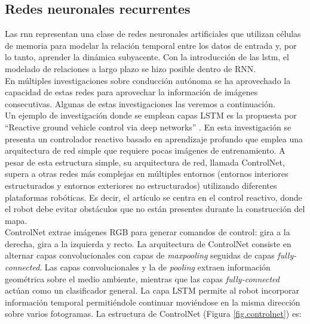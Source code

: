 \subsection{Redes neuronales recurrentes}


Las \acrfull{rnn} representan una clase de redes neuronales artificiales que utilizan células de memoria para modelar la relación temporal entre los datos de entrada y, por lo tanto, aprender la dinámica subyacente. Con la introducción de las \acrfull{lstm}, el modelado de relaciones a largo plazo se hizo posible dentro de RNN.\\

En múltiples investigaciones sobre conducción autónoma se ha aprovechado la capacidad de estas redes para aprovechar la información de imágenes consecutivas. Algunas de estas investigaciones las veremos a continuación.\\

Un ejemplo de investigación donde se emplean capas LSTM es la propuesta por ``Reactive  ground  vehicle  control  via  deep networks'' \cite{reactive-ground}. En esta investigación se presenta un controlador reactivo basado en aprendizaje profundo que emplea una arquitectura de red simple que requiere pocas imágenes de entrenamiento. A pesar de esta estructura simple, su arquitectura de red, llamada ControlNet, supera a otras redes más complejas en múltiples entornos (entornos interiores estructurados y entornos exteriores no estructurados) utilizando diferentes plataformas robóticas. Es decir, el artículo se centra en el control reactivo, donde el robot debe evitar obstáculos que no están presentes durante la construcción del mapa.\\

ControlNet extrae imágenes RGB para generar comandos de control: gira a la derecha, gira a la izquierda y recto. La arquitectura de ControlNet consiste en alternar capas convolucionales con capas de \textit{maxpooling} seguidas de capas \textit{fully-connected}. Las capas convolucionales y la de \textit{pooling} extraen información geométrica sobre el medio ambiente, mientras que las capas \textit{fully-connected} actúan como un clasificador general. La capa LSTM permite al robot incorporar información temporal permitiéndole continuar moviéndose en la misma dirección sobre varios fotogramas. La estructura de ControlNet (Figura \ref{fig.controlnet}) es:

